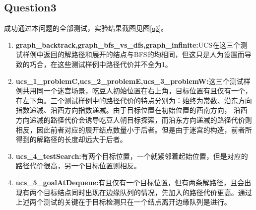 \subsection{Question3}
成功通过本问题的全部测试，实验结果截图见图\ref{q3}。
\begin{enumerate}
    \item {\bfseries graph\_backtrack,graph\_bfs\_vs\_dfs,graph\_infinite:}UCS在这三个测试样例中返回的解路径和展开的结点与BFS的均相同，但这只是人为设置而导致的巧合，在这些测试样例中路径代价并不全为1。
    \item {\bfseries ucs\_1\_problemC,ucs\_2\_problemE,ucs\_3\_problemW:}这三个测试样例共用同一个迷宫场景，吃豆人初始位置在右上角，目标位置有且仅有一个，在左下角。三个测试样例中的路径代价的特点分别为：始终为常数、沿东方向指数递减、沿西方向指数递减。由于目标位置在初始位置的西南方向，
    沿西方向递减的路径代价会诱导吃豆人朝目标探索，而沿东方向递减的路径代价则相反，因此前者对应的展开结点数量小于后者。但是由于迷宫的构造，前者所得到的解路径的长度却远大于后者。
    \item {\bfseries ucs\_4\_testSearch:}有两个目标位置，一个就紧邻着起始位置，但是对应的路径代价很高，另一个目标位置则相反。
    \item {\bfseries ucs\_5\_goalAtDequeue:}有且仅有一个目标位置，但有两条解路径，且会出现有两个目标结点同时出现在边缘队列的情况，先加入的路径代价更高。通过上述两个测试的关键在于目标检测只在一个结点离开边缘队列是进行。
\end{enumerate}
